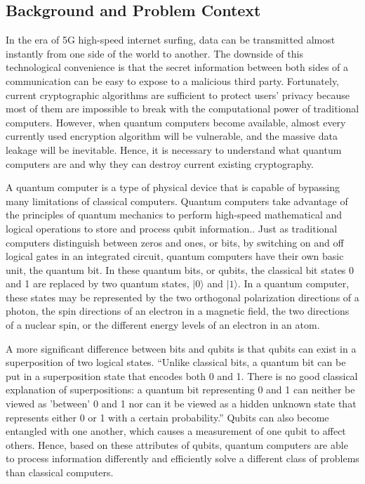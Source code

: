 \documentclass[sigconf]{acmart}
\begin{document}
\subsection{Background and Problem Context}
In the era of 5G high-speed internet surfing, data can be transmitted almost instantly from one side of the world to another. The downside of this technological convenience is that the secret information between both sides of a communication can be easy to expose to a malicious third party. Fortunately, current cryptographic algorithms are sufficient to protect users' privacy because most of them are impossible to break with the computational power of traditional computers. However, when quantum computers become available, almost every currently used encryption algorithm will be vulnerable, and the massive data leakage will be inevitable. Hence, it is necessary to understand what quantum computers are and why they can destroy current existing cryptography.

A quantum computer is a type of physical device that is capable of bypassing many limitations of classical computers. Quantum computers take advantage of the principles of quantum mechanics to perform  high-speed mathematical and logical operations to store and process qubit information.\cite{shi_superconducting_2015}. Just as traditional computers distinguish between zeros and ones, or bits, by switching on and off logical gates in an integrated circuit, quantum computers have their own basic unit, the quantum bit. In these quantum bits, or qubits, the classical bit states 0 and 1 are replaced by two quantum states, $\rvert 0\rangle$ and $\rvert 1\rangle$. In a quantum computer, these states may be represented by the two orthogonal polarization directions of a photon, the spin directions of an electron in a magnetic field, the two directions of a nuclear spin, or the different energy levels of an electron in an atom.

A more significant difference between bits and qubits is that qubits can exist in a superposition of two logical states. “Unlike classical bits, a quantum bit can be put in a superposition state that encodes both 0 and 1. There is no good classical explanation of superpositions: a quantum bit representing 0 and 1 can neither be viewed as 'between' 0 and 1 nor can it be viewed as a hidden unknown state that represents either 0 or 1 with a certain probability.”\cite{rieffel_introduction_1998} Qubits can also become entangled with one another, which causes a measurement of one qubit to affect others. Hence, based on these attributes of qubits, quantum computers are able to process information differently and efficiently solve a different class of problems than classical computers.
\end{document}
